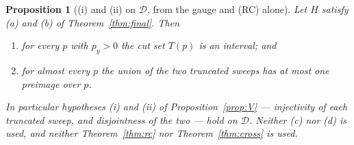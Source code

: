 \documentclass[11pt]{article}
\newtheorem{proposition}[theorem]{Proposition}
\theoremstyle{definition}
\begin{document}
\begin{proposition}[(i) and (ii) on $\mathcal D$, from the gauge and (RC) alone]
\label{prop:oneentry}
Let $H$ satisfy (a) and (b) of Theorem~\ref{thm:final}. Then
\begin{enumerate}
\item[(1)] for every $p$ with $p_y>0$ the cut set $T(p)$ is an interval; and
\item[(2)] for almost every $p$ the union of the two truncated sweeps has at most one
preimage over $p$.
\end{enumerate}
In particular hypotheses (i) and (ii) of Proposition~\ref{prop:V} --- injectivity of each
truncated sweep, and disjointness of the two --- hold on $\mathcal D$. Neither (c) nor (d) is
used, and neither Theorem~\ref{thm:rc} nor Theorem~\ref{thm:cross} is used.
\end{proposition}
\end{document}
